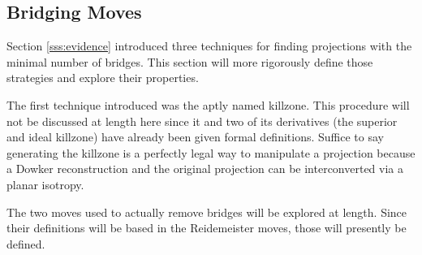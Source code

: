 \documentclass[titlepage]{article}
\begin{document}
\subsection{Bridging Moves}\label{sss:bridging}
Section \ref{sss:evidence} introduced three techniques for finding projections with the minimal number of bridges. This section will more rigorously define those strategies and explore their properties.\par
The first technique introduced was the aptly named killzone. This procedure will not be discussed at length here since it and two of its derivatives (the superior and ideal killzone) have already been given formal definitions. Suffice to say generating the killzone is a perfectly legal way to manipulate a projection because a Dowker reconstruction and the original projection can be interconverted via a planar isotropy.\par
The two moves used to actually remove bridges will be explored at length. Since their definitions will be based in the Reidemeister moves, those will presently be defined.\par
\end{document}
